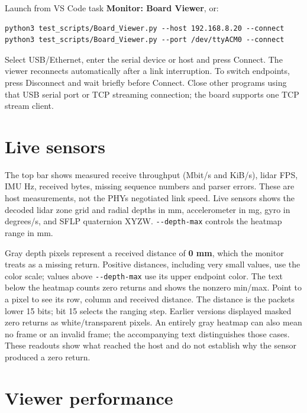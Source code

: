 \documentclass[10pt,a4paper,oneside]{report}
\begin{document}
Launch from VS Code task \textbf{Monitor: Board Viewer}, or:

\begin{verbatim}
python3 test_scripts/Board_Viewer.py --host 192.168.8.20 --connect
python3 test_scripts/Board_Viewer.py --port /dev/ttyACM0 --connect
\end{verbatim}

Select USB/Ethernet, enter the serial device or host and press Connect. The viewer reconnects automatically after a link interruption. To switch endpoints, press Disconnect and wait briefly before Connect. Close other programs using that USB serial port or TCP streaming connection; the board supports one TCP stream client.

\section{Live sensors}\label{wiki-tools-device-monitor--live-sensors}

The top bar shows measured receive throughput (Mbit/s and KiB/s), lidar FPS, IMU Hz, received bytes, missing sequence numbers and parser errors. These are host measurements, not the PHY\textquotesingle s negotiated link speed. Live sensors shows the decoded lidar zone grid and radial depths in mm, accelerometer in mg, gyro in degrees/s, and SFLP quaternion XYZW. \texttt{-\allowbreak{}-\allowbreak{}depth-\allowbreak{}max} controls the heatmap range in mm.

Gray depth pixels represent a received distance of \textbf{0 mm}, which the monitor treats as a missing return. Positive distances, including very small values, use the color scale; values above \texttt{-\allowbreak{}-\allowbreak{}depth-\allowbreak{}max} use its upper endpoint color. The text below the heatmap counts zero returns and shows the nonzero min/max. Point to a pixel to see its row, column and received distance. The distance is the packet\textquotesingle s lower 15 bits; bit 15 selects the ranging step. Earlier versions displayed masked zero returns as white/transparent pixels. An entirely gray heatmap can also mean no frame or an invalid frame; the accompanying text distinguishes those cases. These readouts show what reached the host and do not establish why the sensor produced a zero return.

\section{Viewer performance}\label{wiki-tools-device-monitor--viewer-performance}
\end{document}

